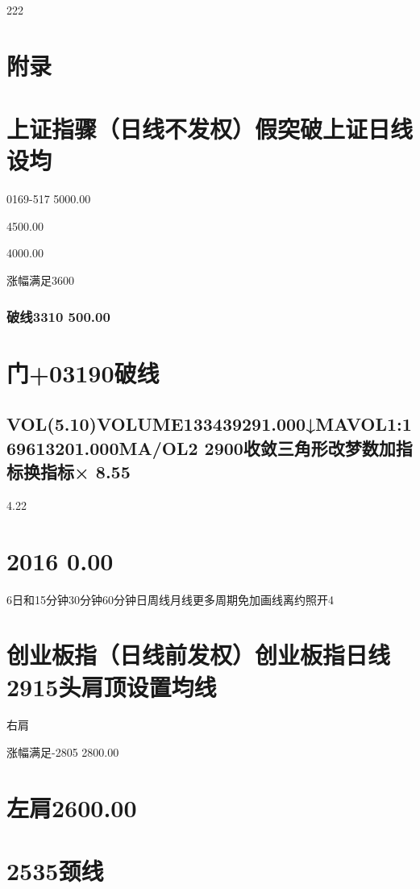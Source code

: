 \documentclass{article}
\begin{document}
222

\clearpage

\section{附录}

\section{上证指骤（日线不发权）假突破上证日线设均}

0169-517 5000.00

4500.00

4000.00

涨幅满足3600

\subsubsection{破线3310 500.00}

\section{门+03190破线}

\subsection{VOL(5.10)VOLUME133439291.000↓MAVOL1:169613201.000MA/OL2 2900收敛三角形改梦数加指标换指标× 8.55}

4.22

\section{2016 0.00}

6日和15分钟30分钟60分钟日周线月线更多周期免加画线离约照开4

\section{创业板指（日线前发权）创业板指日线2915头肩顶设置均线}

右肩

涨幅满足-2805 2800.00

\section{左肩2600.00}

\section{2535颈线}
\end{document}
